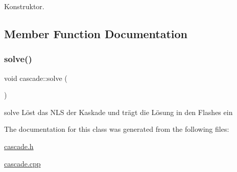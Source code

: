 Konstruktor. 



\subsection{Member Function Documentation}
\mbox{\label{classcascade_a97774229982891611641e05bfe4d8c06}} 
\subsubsection{\texorpdfstring{solve()}{solve()}}
{\footnotesize\ttfamily void cascade\+::solve (\begin{DoxyParamCaption}{ }\end{DoxyParamCaption})\hspace{0.3cm}{\ttfamily [inline]}}



solve Löst das N\+LS der Kaskade und trägt die Lösung in den Flashes ein 



The documentation for this class was generated from the following files\+:\begin{DoxyCompactItemize}
\item 
\mbox{\hyperlink{cascade_8h}{cascade.\+h}}\item 
\mbox{\hyperlink{cascade_8cpp}{cascade.\+cpp}}\end{DoxyCompactItemize}
